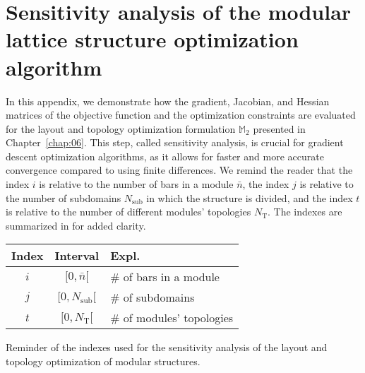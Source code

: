 \chapter{Sensitivity analysis of the modular lattice structure optimization algorithm} \label{app:01}
In this appendix, we demonstrate how the gradient, Jacobian, and Hessian matrices of the objective function and the optimization constraints are evaluated for the layout and topology optimization formulation $\mathbb{M}_2$ presented in Chapter~\ref{chap:06}. This step, called sensitivity analysis, is crucial for gradient descent optimization algorithms, as it allows for faster and more accurate convergence compared to using finite differences.  We remind the reader that the index $i$ is relative to the number of bars in a module $\bar{n}$, the index $j$ is relative to the number of subdomains $N_\text{sub}$ in which the structure is divided, and the index $t$ is relative to the number of different modules' topologies $N_\text{T}$. The indexes are summarized in  for added clarity.

\begin{margintable}
    \small
    \centering
    \begin{tabular}{ccx{1.4cm}}
    \toprule
    \textbf{Index}        & \textbf{Interval} & \textbf{Expl.} \\ \midrule
    $i$ &$[0,\bar{n}[$& \# of bars in a module\\
    $j$ &$[0,N_\text{sub}[$& \# of subdomains\\
    $t$ &$[0,N_\text{T}[$& \# of modules' topologies\\
    \bottomrule
    \end{tabular}
    \caption{Reminder of the indexes used for the sensitivity analysis of the layout and topology optimization of modular structures.}
    \label{tab:appA_indexes}
\end{margintable}

